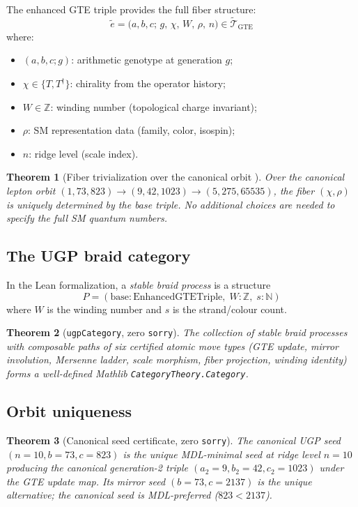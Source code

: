 \documentclass[12pt]{article}
\newtheorem{theorem}{Theorem}[section]
\theoremstyle{remark}
\newcommand{\GTE}{\mathrm{GTE}}
\newcommand{\sorry}{\texttt{sorry}}
\newcommand{\lean}[1]{\texttt{#1}}
\begin{document}
The enhanced GTE triple provides the full fiber structure:
\begin{equation}
  \tilde{e} = \bigl(a,b,c;\, g,\, \chi,\, W,\, \rho,\, n\bigr) \in
  \tilde{\mathcal{T}}_{\GTE}
\end{equation}
where:
\begin{itemize}
  \item $(a,b,c;g)$: arithmetic genotype at generation $g$;
  \item $\chi \in \{T, T^\dagger\}$: chirality from the operator history;
  \item $W \in \mathbb{Z}$: winding number (topological charge invariant);
  \item $\rho$: SM representation data (family, color, isospin);
  \item $n$: ridge level (scale index).
\end{itemize}

\begin{theorem}[Fiber trivialization over the canonical orbit \cite{ugp-lean}]
Over the canonical lepton orbit $(1,73,823) \to (9,42,1023) \to (5,275,65535)$,
the fiber $(\chi, \rho)$ is uniquely determined by the base triple.  No
additional choices are needed to specify the full SM quantum numbers.
\end{theorem}

\subsection{The UGP braid category}

In the Lean formalization, a \emph{stable braid process} is a structure
\[
  P = (\text{base} : \text{EnhancedGTETriple},\; W : \mathbb{Z},\;
       s : \mathbb{N})
\]
where $W$ is the winding number and $s$ is the strand/colour count.

\begin{theorem}[\lean{ugpCategory}, zero \sorry]
The collection of stable braid processes with composable paths of six certified
atomic move types (GTE update, mirror involution, Mersenne ladder, scale
morphism, fiber projection, winding identity) forms a well-defined Mathlib
\texttt{CategoryTheory.Category}.
\end{theorem}

\subsection{Orbit uniqueness}

\begin{theorem}[Canonical seed certificate, zero \sorry]
The canonical UGP seed $(n=10, b=73, c=823)$ is the unique MDL-minimal
seed at ridge level $n = 10$ producing the canonical generation-2 triple
$(a_2 = 9, b_2 = 42, c_2 = 1023)$ under the GTE update map.  Its mirror seed
$(b = 73, c = 2137)$ is the unique alternative; the canonical seed is
MDL-preferred ($823 < 2137$).
\end{theorem}
\end{document}
